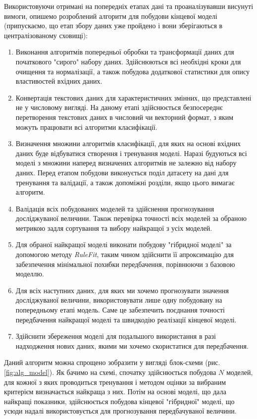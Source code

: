 Використовуючи отримані на попередніх етапах дані та проаналізувавши висунуті вимоги, опишемо розроблений алгоритм для побудови кінцевої моделі (припускаємо, що етап збору даних уже пройдено і вони зберігаються в централізованому сховищі):
\begin{enumerate}  
	\item Виконання алгоритмів попередньої обробки та трансформації даних для початкового "сирого" набору даних. Здійснюються всі необхідні кроки для очищення та нормалізації, а також побудова додаткової статистики для опису властивостей вхідних даних.
	\item Конвертація текстових даних для характеристичних змінних, що представлені не у числовому вигляді. На даному етапі здійснюється безпосереднє перетворення текстових даних в числовий чи векторний формат, з яким можуть працювати всі алгоритми класифікації.
	\item Визначення множини алгоритмів класифікації, для яких на основі вхідних даних буде відбуватися створення і тренування моделі. Наразі будуються всі моделі з множини наперед визначених алгоритмів не залежно від набору даних. Перед етапом побудови виконується поділ датасету на дані для тренування та валідації, а також допоміжні розділи, якщо цього вимагає алгоритм.
	\item Валідація всіх побудованих моделей та здійснення прогнозування досліджуваної величини. Також перевірка точності всіх моделей за обраною метрикою задля сортування та вибору найкращої з усіх моделей.
	\item Для обраної найкращої моделі виконати побудову "гібридної моделі" за допомогою методу \textit{RuleFit}, таким чином здійснити її апроксимацію для забезпечення мінімальної похибки передбачення, порівнюючи з базовою моделлю.
	\item Для всіх наступних даних, для яких ми хочемо прогнозувати значення досліджуваної величини, використовувати лише одну побудовану на попередньому етапі модель. Саме це забезпечить поєднання точності передбачення найкращої моделі та швидкодію реалізації кінцевої моделі.
	\item Здійснити збереження моделі для подальшого використання в разі надходження нових даних, якими ми хочемо скористатися для передбачення.
\end{enumerate}

Даний алгоритм можна спрощено зобразити у вигляді блок-схеми (рис. \ref{fig:alg_model}). Як бачимо на схемі, спочатку здійснюється побудова $N$ моделей, для кожної з яких проводиться тренування і методом оцінки за вибраним критерієм визначається найкраща з них. Потім на основі моделі, що дала найкращі показники, здійснюється побудова кінцевої "гібридної" моделі, що усюди надалі використовується для прогнозування передбачуваної величини.

